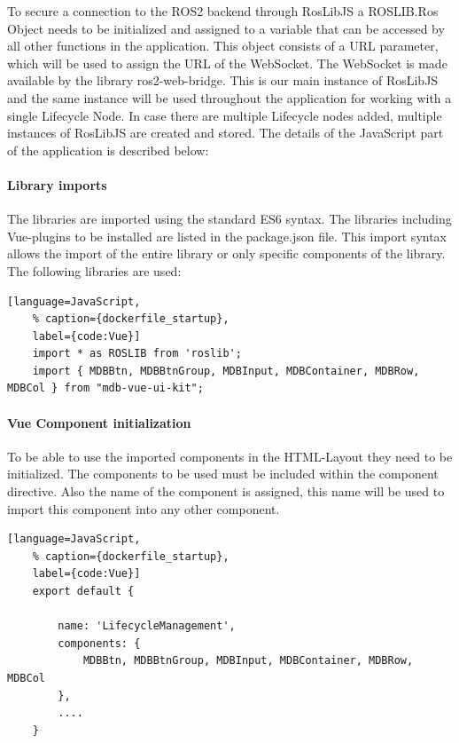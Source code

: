 To secure a connection to the ROS2 backend through RosLibJS a ROSLIB.Ros Object needs to be initialized and assigned to a variable that can be accessed by all other functions in the application. This object consists of a URL parameter, which will be used to assign the URL of the WebSocket. The WebSocket is made available by the library ros2-web-bridge. This is our main instance of RosLibJS and the same instance will be used throughout the application for working with a single Lifecycle Node. In case there are multiple Lifecycle nodes added, multiple instances of RosLibJS are created and stored. The details of the JavaScript part of the application is described below:

\paragraph{Library imports} The libraries are imported using the standard ES6 syntax. The libraries including Vue-plugins to be installed are listed in the package.json file. This import syntax allows the import of the entire library or only specific components of the library. The following libraries are used:

\begin{lstlisting}[language=JavaScript,
	% caption={dockerfile_startup}, 
	label={code:Vue}]
	import * as ROSLIB from 'roslib';
	import { MDBBtn, MDBBtnGroup, MDBInput, MDBContainer, MDBRow, MDBCol } from "mdb-vue-ui-kit";
\end{lstlisting}

\paragraph{Vue Component initialization} To be able to use the imported components in the HTML-Layout they need to be initialized. The components to be used must be included within the component directive. Also the name of the component is assigned, this name will be used to import this component into any other component. 
\begin{lstlisting}[language=JavaScript,
	% caption={dockerfile_startup}, 
	label={code:Vue}]
	export default {
	
		name: 'LifecycleManagement',
		components: {
			MDBBtn, MDBBtnGroup, MDBInput, MDBContainer, MDBRow, MDBCol
		},
		....
	}
\end{lstlisting}

